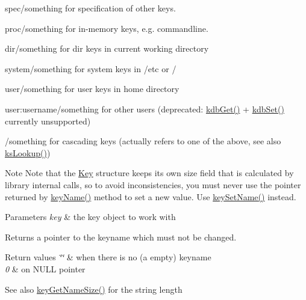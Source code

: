 \begin{DoxyItemize}
\item {\ttfamily spec/something} for specification of other keys.
\item {\ttfamily proc/something} for in-\/memory keys, e.\+g. commandline.
\item {\ttfamily dir/something} for dir keys in current working directory
\item {\ttfamily system/something} for system keys in /etc or /
\item {\ttfamily user/something} for user keys in home directory
\item {\ttfamily user\+:username/something} for other users (deprecated\+: \hyperlink{group__kdb_ga28e385fd9cb7ccfe0b2f1ed2f62453a1}{kdb\+Get()} + \hyperlink{group__kdb_ga11436b058408f83d303ca5e996832bcf}{kdb\+Set()} currently unsupported)
\item {\ttfamily /something} for cascading keys (actually refers to one of the above, see also \hyperlink{group__keyset_gaa34fc43a081e6b01e4120daa6c112004}{ks\+Lookup()})

\begin{DoxyNote}{Note}
Note that the \hyperlink{classkdb_1_1Key}{Key} structure keeps its own size field that is calculated by library internal calls, so to avoid inconsistencies, you must never use the pointer returned by \hyperlink{group__keyname_ga8e805c726a60da921d3736cda7813513}{key\+Name()} method to set a new value. Use \hyperlink{group__keyname_ga7699091610e7f3f43d2949514a4b35d9}{key\+Set\+Name()} instead.
\end{DoxyNote}

\begin{DoxyParams}{Parameters}
{\em key} & the key object to work with \\
\hline
\end{DoxyParams}
\begin{DoxyReturn}{Returns}
a pointer to the keyname which must not be changed. 
\end{DoxyReturn}

\begin{DoxyRetVals}{Return values}
{\em \char`\"{}\char`\"{}} & when there is no (a empty) keyname \\
\hline
{\em 0} & on N\+U\+L\+L pointer \\
\hline
\end{DoxyRetVals}
\begin{DoxySeeAlso}{See also}
\hyperlink{group__keyname_gabdbcfa51ed8a387e47ead207affa2d2e}{key\+Get\+Name\+Size()} for the string length 


\end{DoxySeeAlso}
\end{DoxyItemize}

